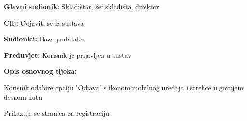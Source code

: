 		
					\noindent {}
					\begin{packed_item}
	
						\item \textbf{Glavni sudionik: }Skladištar, šef skladišta, direktor
						\item  \textbf{Cilj:} Odjaviti se iz sustava
						\item  \textbf{Sudionici:} Baza podataka
						\item  \textbf{Preduvjet:} Korisnik je prijavljen u sustav
						\item  \textbf{Opis osnovnog tijeka:}
						
						\item[] \begin{packed_enum}
	
							\item Korisnik odabire opciju "Odjava" s ikonom mobilnog uređaja i strelice u gornjem desnom kutu
							\item Prikazuje se stranica za registraciju 
														
						\end{packed_enum}
					\end{packed_item}	
					
